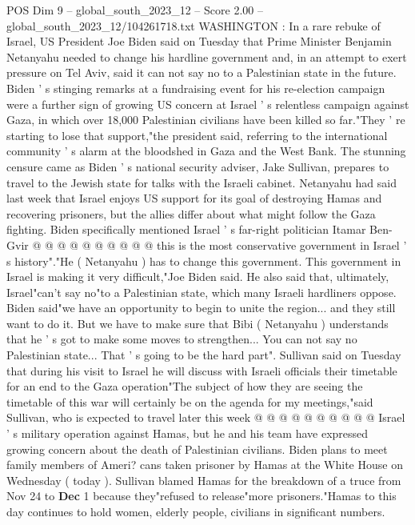 \begin{textsample}{POS Dim 9 – global\_south\_2023\_12 – Score 2.00 – global\_south\_2023\_12/104261718.txt}  \label{ex:f9_pos_018}
WASHINGTON : In a rare rebuke of Israel, US President Joe Biden said on Tuesday that Prime Minister Benjamin Netanyahu needed to change his hardline government and, in an attempt to exert pressure on Tel Aviv, said it can not say no to a Palestinian state in the future.
Biden ' s stinging remarks at a fundraising event for his re-election campaign were a further sign of growing US concern at Israel ' s relentless campaign against Gaza, in which over 18,000 Palestinian civilians have been killed so far."They ' re starting to lose that support,"the president said, referring to the international community ' s alarm at the bloodshed in Gaza and the West Bank.
The stunning censure came as Biden ' s national security adviser, Jake Sullivan, prepares to travel to the Jewish state for talks with the Israeli cabinet.
Netanyahu had said last week that Israel enjoys US support for its goal of destroying Hamas and recovering prisoners, but the allies differ about what might follow the Gaza fighting.
Biden specifically mentioned Israel ' s far-right politician Itamar Ben-Gvir @ @ @ @ @ @ @ @ @ @ this is the most conservative government in Israel ' s history"."He ( Netanyahu ) has to change this government.
This government in Israel is making it very difficult,"Joe Biden said.
He also said that, ultimately, Israel"can't say no"to a Palestinian state, which many Israeli hardliners oppose.
Biden said"we have an opportunity to begin to unite the region... and they still want to do it.
But we have to make sure that Bibi ( Netanyahu ) understands that he ' s got to make some moves to strengthen...
You can not say no Palestinian state...
That ' s going to be the hard part".
Sullivan said on Tuesday that during his visit to Israel he will discuss with Israeli officials their timetable for an end to the Gaza operation"The subject of how they are seeing the timetable of this war will certainly be on the agenda for my meetings,"said Sullivan, who is expected to travel later this week @ @ @ @ @ @ @ @ @ @ Israel ' s military operation against Hamas, but he and his team have expressed growing concern about the death of Palestinian civilians.
Biden plans to meet family members of Ameri? cans taken prisoner by Hamas at the White House on Wednesday ( today ).
Sullivan blamed Hamas for the breakdown of a truce from Nov 24 to \textbf{Dec} 1 because they"refused to release"more prisoners."Hamas to this day continues to hold women, elderly people, civilians in significant numbers.

\end{textsample}

